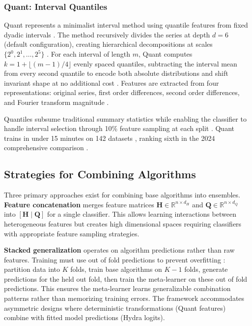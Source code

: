 \documentclass[pdflatex,sn-basic]{sn-jnl}           %
\theoremstyle{thmstyleone}%
\theoremstyle{thmstyletwo}%
\theoremstyle{thmstylethree}%
\begin{document}
\subsubsection{Quant: Interval Quantiles}

Quant represents a minimalist interval method using quantile features from fixed dyadic intervals \citep{quant}. The method recursively divides the series at depth $d=6$ (default configuration), creating hierarchical decompositions at scales $\{2^0, 2^1, \ldots, 2^5\}$ \citep[p.~2384]{quant}. For each interval of length $m$, Quant computes $k = 1 + \lfloor (m-1)/4 \rfloor$ evenly spaced quantiles, subtracting the interval mean from every second quantile to encode both absolute distributions and shift invariant shape at no additional cost \citep[p.~2385, Figure~4, p.~2386]{quant}. Features are extracted from four representations: original series, first order differences, second order differences, and Fourier transform magnitude \citep[Section~3.1, p.~2384]{quant}.

Quantiles subsume traditional summary statistics \citep[p.~2378]{quant} while enabling the classifier to handle interval selection through 10\% feature sampling at each split \citep[Section~4.2.6, p.~2387]{quant}. Quant trains in under 15 minutes on 142 datasets \citep[p.~2390]{quant}, ranking sixth in the 2024 comprehensive comparison \citep[Table~14, p.~2008]{bakeoff-redux}.

\subsection{Strategies for Combining Algorithms}

Three primary approaches exist for combining base algorithms into ensembles. \textbf{Feature concatenation} merges feature matrices $\mathbf{H} \in \mathbb{R}^{n \times d_H}$ and $\mathbf{Q} \in \mathbb{R}^{n \times d_Q}$ into $[\mathbf{H} \mid \mathbf{Q}]$ for a single classifier. This allows learning interactions between heterogeneous features but creates high dimensional spaces requiring classifiers with appropriate feature sampling strategies.

\textbf{Stacked generalization} \citep{stacked-generalization} operates on algorithm predictions rather than raw features. Training must use out of fold predictions to prevent overfitting \citep[p.~244]{stacked-generalization}: partition data into $K$ folds, train base algorithms on $K-1$ folds, generate predictions for the held out fold, then train the meta-learner on these out of fold predictions. This ensures the meta-learner learns generalizable combination patterns rather than memorizing training errors. The framework accommodates asymmetric designs where deterministic transformations (Quant features) combine with fitted model predictions (Hydra logits).
\end{document}
